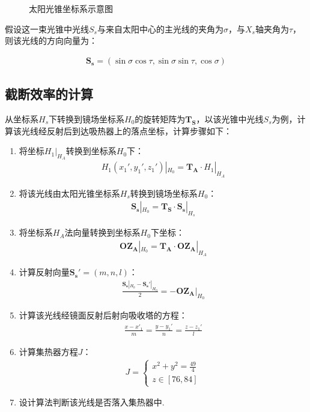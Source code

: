 \documentclass[withoutpreface,bwprint]{cumcmthesis} %
\begin{document}
\begin{figure}[H]
\begin{center}
\begin{tikzpicture}[x=0.75pt,y=0.75pt,yscale=-1,xscale=1]
\end{tikzpicture}

\end{center}\caption{太阳光锥坐标系示意图}\label{gz}
\end{figure}

假设这一束光锥中光线$S_s$与来自太阳中心的主光线的夹角为$\sigma$，与$X_s$轴夹角为$\tau$，则该光线的方向向量为：

\begin{eqnarray}
\mathbf{S_s}=(\sin \sigma\cos \tau,\sin\sigma\sin\tau,\cos\sigma)
\end{eqnarray}

\subsection{截断效率的计算}
从坐标系$H_s$下转换到镜场坐标系$H_0$的旋转矩阵为$\mathbf{T_S}$，以该光锥中光线$S_s$为例，计算该光线经反射后到达吸热器上的落点坐标，计算步骤如下：
\begin{enumerate}[label=$Step$ \arabic*:, leftmargin=*]
\item 将坐标$H_1|_{H_A}$转换到坐标系$H_0$下：
\begin{eqnarray}
H_1(x_1',y_1',z_1')|_{H_0}=\mathbf{T_A}\cdot H_1|_{H_A}
\end{eqnarray}
\item 将该光线由太阳光锥坐标系$H_s$转换到镜场坐标系$H_0$：
\begin{eqnarray}
\mathbf{S_s}|_{H_0}=\mathbf{T_S}\cdot \mathbf{S_s}|_{H_s}
\end{eqnarray}
\item 将坐标系$H_A$法向量转换到坐标系$H_0$下坐标：
\begin{eqnarray}
\mathbf{OZ_A}|_{H_0}=\mathbf{T_A}\cdot \mathbf{OZ_A}|_{H_A}
\end{eqnarray}
\item 计算反射向量$\mathbf{S_s'}=(m,n,l)$：
\begin{eqnarray}
\frac{\mathbf{S_s}|_{H_0}-\mathbf{S_s'}|_{H_0}}{2}=-\mathbf{OZ_A}|_{H_0}
\end{eqnarray}
\item 计算该光线经镜面反射后射向吸收塔的方程：
\begin{eqnarray}
\frac{x-x'_1}{m}=\frac{y-y_1'}{n}=\frac{z-z_1'}{l}
\end{eqnarray}
\item 计算集热器方程$J$：
\begin{eqnarray}
J=\left\{\begin{matrix}
x^2+y^2=\frac{49}{4} \\
z\in[76,84]
\end{matrix}\right.
\end{eqnarray}
\item 设计算法判断该光线是否落入集热器中.
\end{enumerate}
\end{document}

